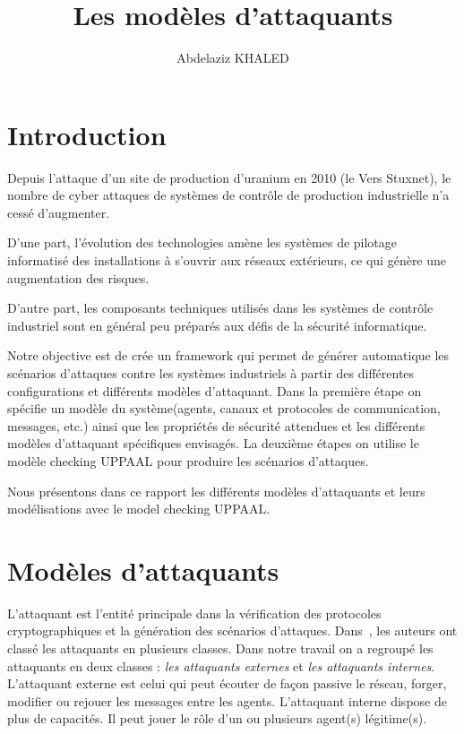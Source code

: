 \documentclass[10pt,a4paper]{article}
\author{Abdelaziz KHALED}
\title{Les modèles d'attaquants}
\begin{document}
\let\cleardoublepage\clearpage
\maketitle
\newpage
\tableofcontents
\newpage
\section{Introduction}
Depuis l’attaque d’un site de production d’uranium en 2010 (le Vers Stuxnet), le nombre
de cyber attaques de systèmes de contrôle de production industrielle n’a cessé d’augmenter.\newline
 
D'une part, l'évolution des technologies amène les systèmes de pilotage informatisé des installations à s'ouvrir aux réseaux extérieurs, ce qui génère une augmentation des risques.\newline

D’autre part, les composants techniques utilisés dans les systèmes de contrôle industriel sont en général peu préparés aux défis de la sécurité informatique.
\newline

Notre objective est de crée un framework qui permet de générer automatique les scénarios d'attaques contre les systèmes industriels à partir des différentes configurations et différents modèles d'attaquant. Dans la première étape on spécifie un modèle du système(agents, canaux et protocoles de communication, messages, etc.) ainsi que les propriétés de sécurité attendues et les différents modèles d'attaquant spécifiques envisagés. La deuxième étapes on utilise le modèle checking UPPAAL pour produire les scénarios d'attaques.\newline
  
Nous présentons dans ce rapport les différents modèles d'attaquants et leurs modélisations avec le model checking UPPAAL.  
\section{Modèles d'attaquants}
L'attaquant est l'entité principale dans la vérification des protocoles cryptographiques et la génération des scénarios d'attaques. Dans~\cite{ref1}, les auteurs ont classé les attaquants en plusieurs classes. Dans notre travail on a regroupé les attaquants en deux classes : \textit{les attaquants externes} et \textit{les attaquants internes}. L'attaquant externe est celui qui peut écouter de façon passive le réseau, forger, modifier ou rejouer les messages entre les agents. L'attaquant interne dispose de plus de capacités. Il peut jouer le rôle d'un ou plusieurs agent(s) légitime(s).\newline
\end{document}
